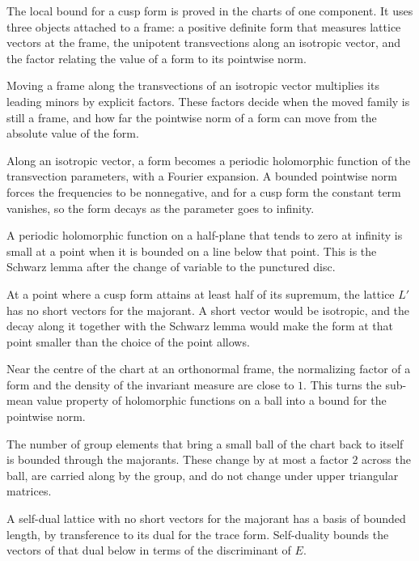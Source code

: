 The local bound for a cusp form is proved in the charts of one component. It uses three objects attached
to a frame: a positive definite form that measures lattice vectors at the frame, the unipotent
transvections along an isotropic vector, and the factor relating the value of a form to its pointwise
norm.

Moving a frame along the transvections of an isotropic vector multiplies its leading minors by explicit
factors. These factors decide when the moved family is still a frame, and how far the pointwise norm of a
form can move from the absolute value of the form.

Along an isotropic vector, a form becomes a periodic holomorphic function of the transvection parameters,
with a Fourier expansion. A bounded pointwise norm forces the frequencies to be nonnegative, and for a
cusp form the constant term vanishes, so the form decays as the parameter goes to infinity.

A periodic holomorphic function on a half-plane that tends to zero at infinity is small at a point when it
is bounded on a line below that point. This is the Schwarz lemma after the change of variable to the
punctured disc.

At a point where a cusp form attains at least half of its supremum, the lattice $L'$ has no short vectors
for the majorant. A short vector would be isotropic, and the decay along it together with the Schwarz lemma
would make the form at that point smaller than the choice of the point allows.

Near the centre of the chart at an orthonormal frame, the normalizing factor of a form and the density of
the invariant measure are close to $1$. This turns the sub-mean value property of holomorphic functions on
a ball into a bound for the pointwise norm.

The number of group elements that bring a small ball of the chart back to itself is bounded through the
majorants. These change by at most a factor $2$ across the ball, are carried along by the group, and do
not change under upper triangular matrices.

A self-dual lattice with no short vectors for the majorant has a basis of bounded length, by transference
to its dual for the trace form. Self-duality bounds the vectors of that dual below in terms of the
discriminant of $E$.

